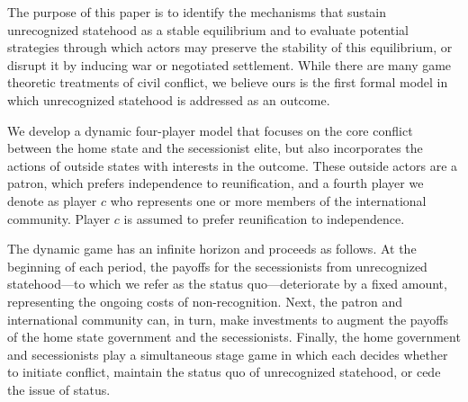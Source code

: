 \documentclass[11pt,letterpaper, notitlepage]{article}
\begin{document}


The purpose of this paper is to identify the mechanisms that sustain unrecognized statehood as a stable equilibrium and to evaluate potential strategies through which actors may preserve the stability of this equilibrium, or disrupt it by inducing war or negotiated settlement. While there are many game theoretic treatments of civil conflict, we believe ours is the first formal model in which unrecognized statehood is addressed as an outcome.

We develop a dynamic four-player model that focuses on the core conflict between the home state and the secessionist elite, but also incorporates the actions of outside states with interests in the outcome. These outside actors are a patron, which prefers independence to reunification, and a fourth player we denote as player $c$ who represents one or more members of the international community. Player $c$ is assumed to prefer reunification to independence. 

The dynamic game has an infinite horizon and proceeds as follows. At the beginning of each period, the payoffs for the secessionists from unrecognized statehood---to which we refer as the status quo---deteriorate by a fixed amount, representing the ongoing costs of non-recognition. Next, the patron and international community can, in turn, make investments to augment the payoffs of the home state government and the secessionists. Finally, the home government and secessionists play a simultaneous stage game in which each decides whether to initiate conflict, maintain the status quo of unrecognized statehood, or cede the issue of status.
\end{document}
